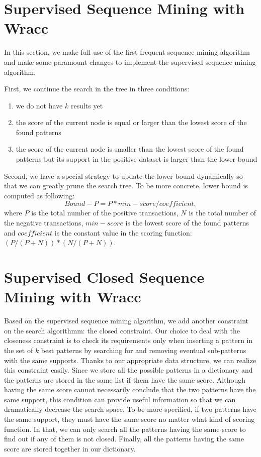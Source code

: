 \documentclass[12pt, a4paper]{report}
\begin{document}
\section{Supervised Sequence Mining with Wracc}
In this section, we make full use of the first frequent sequence mining algorithm and make some paramount changes to implement the supervised sequence mining algorithm.

First, we continue the search in the tree in three conditions:
\begin{enumerate}
    \item we do not have $k$ results yet
    \item the score of the current node is equal or larger than the lowest score of the found patterns 
    \item the score of the current node is smaller than the lowest score of the found patterns but its support in the positive dataset is larger than the lower bound
\end{enumerate}

Second, we have a special strategy to update the lower bound dynamically so that we can greatly prune the search tree. To be more concrete, lower bound is computed as following: 
\begin{equation}
    Bound-P = P * min-score / coefficient,
\end{equation}
where $P$ is the total number of the positive transactions, $N$ is the total number of the negative transactions, $min-score$ is the lowest score of the found patterns and $coefficient$ is the constant value in the scoring function: $(P/(P+N))*(N/(P+N))$.

\section{Supervised Closed Sequence Mining with Wracc}
Based on the supervised sequence mining algorithm, we add another constraint on the search algorithmm: the closed constraint. Our choice to deal with the closeness constraint is to check its requirements only when inserting
a pattern in the set of $k$ best patterns by searching for and removing eventual sub-patterns with the same
supports. Thanks to our appropriate data structure, we can realize this constraint easily. Since we store all the possible patterns in a dictionary and the patterns are stored in the same list if them have the same score. Although having the same score cannot necessarily conclude that the two patterns have the same support, this condition can provide useful information so that we can dramatically decrease the search space. To be more specified, if two patterns have the same support, they must have the same score no matter what kind of scoring function. In that, we can only search all the patterns having the same score to find out if any of them is not closed. Finally, all the patterns having the same score are stored together in our dictionary.
\end{document}
